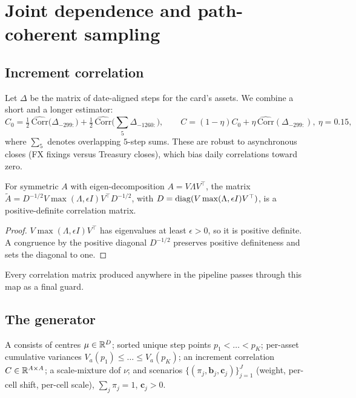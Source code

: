 \section{Joint dependence and path-coherent sampling}\label{sec:sampling}

\subsection{Increment correlation}

Let $\Delta$ be the matrix of date-aligned steps for the card's assets. We combine a short and a longer estimator:
\begin{equation}
  C_0 = \tfrac12\,\widehat{\mathrm{Corr}}\bigl(\Delta_{-299:}\bigr) + \tfrac12\,\widehat{\mathrm{Corr}}\bigl(\textstyle\sum_{5}\Delta_{-1260:}\bigr),\qquad
  C = (1-\eta)C_0+\eta\,\widehat{\mathrm{Corr}}(\Delta_{-299:}),\ \eta=0.15,
\end{equation}
where $\sum_5$ denotes overlapping $5$-step sums. These are robust to asynchronous closes (FX fixings versus Treasury closes), which bias daily
correlations toward zero.

\begin{lemma}\label{lem:nearcorr}
For symmetric $A$ with eigen-decomposition $A=V\Lambda V^\top$, the matrix $\tilde A=D^{-1/2}V\max(\Lambda,\epsilon I)V^\top D^{-1/2}$, with
$D=\operatorname{diag}(V\max(\Lambda,\epsilon I)V^\top)$, is a positive-definite correlation matrix.
\end{lemma}
\begin{proof}
$V\max(\Lambda,\epsilon I)V^\top$ has eigenvalues at least $\epsilon>0$, so it is positive definite. A congruence by the positive diagonal $D^{-1/2}$
preserves positive definiteness and sets the diagonal to one.
\end{proof}
Every correlation matrix produced anywhere in the pipeline passes through this map as a final guard.

\subsection{The generator}

\begin{definition}
A  consists of centres $\mu\in\mathbb{R}^D$; sorted unique step points $p_1<\dots<p_K$; per-asset cumulative variances
$V_a(p_1)\le\dots\le V_a(p_K)$; an increment correlation $C\in\mathbb{R}^{A\times A}$; a scale-mixture dof $\nu$; and scenarios
$\{(\pi_j,\bm b_j,\bm c_j)\}_{j=1}^J$ (weight, per-cell shift, per-cell scale), $\sum_j\pi_j=1$, $\bm c_j>0$.
\end{definition}

